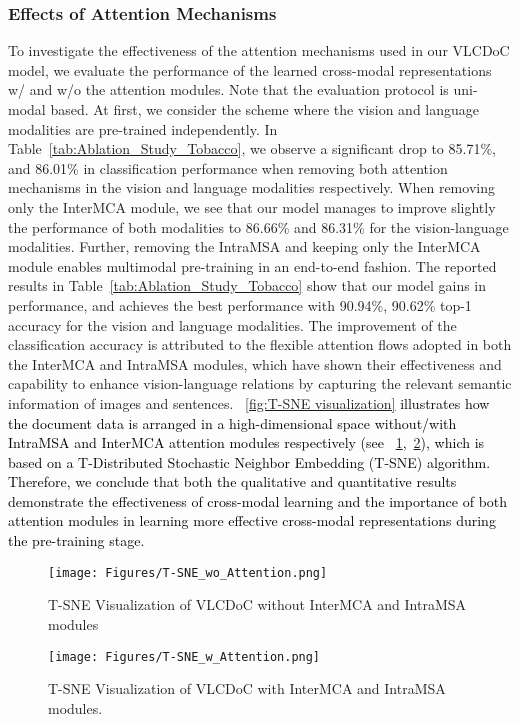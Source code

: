 \documentclass[preprint,review,12pt]{elsarticle}
\begin{document}
\subsubsection{Effects of Attention Mechanisms}
To investigate the effectiveness of the attention mechanisms used in our VLCDoC model, we evaluate the performance of the learned cross-modal representations w/ and w/o the attention modules. Note that the evaluation protocol is uni-modal based. At first, we consider the scheme where the vision and language modalities are pre-trained independently. In Table~\ref{tab:Ablation_Study_Tobacco}, we observe a significant drop to 85.71\%, and 86.01\% in classification performance when removing both attention mechanisms in the vision and language modalities respectively. When removing only the InterMCA module, we see that our model manages to improve slightly the performance of both modalities to 86.66\% and 86.31\% for the vision-language modalities. Further, removing the IntraMSA and keeping only the InterMCA module enables multimodal pre-training in an end-to-end fashion. The reported results in Table~\ref{tab:Ablation_Study_Tobacco} show that our model gains in performance, and achieves the best performance with 90.94\%, 90.62\% top-1 accuracy for the vision and language modalities.
The improvement of the classification accuracy is attributed to the flexible attention flows adopted in both the InterMCA and IntraMSA modules, which have shown their effectiveness and capability to enhance vision-language relations by capturing the relevant semantic information of images and sentences. \textcolor{black}{\figurename~\ref{fig:T-SNE visualization} illustrates how the document data is arranged in a high-dimensional space without/with IntraMSA and InterMCA attention modules respectively (see \figurename~\ref{fig:T-SNE w/o Attention},~\ref{fig:T-SNE w Attention}), which is based on a T-Distributed Stochastic Neighbor Embedding (T-SNE) algorithm. Therefore, we conclude that both the qualitative and quantitative results demonstrate the effectiveness of cross-modal learning and the importance of both attention modules in learning more effective cross-modal representations during the pre-training stage. }
\begin{figure*}[t]
\centering
\begin{subfigure}{\textwidth}
  {
  \texttt{[image: Figures/T-SNE\_wo\_Attention.png]}}\quad
  \caption{T-SNE Visualization of VLCDoC without InterMCA and IntraMSA modules}
  \label{fig:T-SNE w/o Attention}
\end{subfigure}
\hfill
\begin{subfigure}{\textwidth}
  {
  \texttt{[image: Figures/T-SNE\_w\_Attention.png]}}\quad
  \caption{T-SNE Visualization of VLCDoC with InterMCA and IntraMSA modules.}
  \label{fig:T-SNE w Attention}
\end{subfigure}
\caption{T-SNE vision and language embedding visualization of VLCDoC.}
\label{fig:T-SNE visualization}
\end{figure*}
\end{document}
